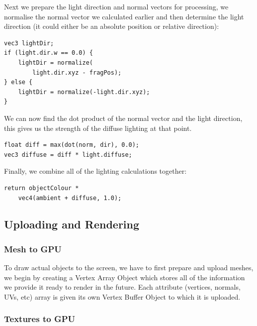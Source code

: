 \documentclass{article}
\begin{document}
\begin{multicols}{2}
                    Next we prepare the light direction and normal vectors for processing, we normalise the normal vector we calculated earlier and then determine the light direction (it could either be an absolute position or relative direction):

                    \begin{lstlisting}
vec3 lightDir;
if (light.dir.w == 0.0) {
    lightDir = normalize(
        light.dir.xyz - fragPos);
} else {
    lightDir = normalize(-light.dir.xyz);
}\end{lstlisting}

                    We can now find the dot product of the normal vector and the light direction, this gives us the strength of the diffuse lighting at that point.

                    \begin{lstlisting}
float diff = max(dot(norm, dir), 0.0);
vec3 diffuse = diff * light.diffuse;\end{lstlisting}

                    Finally, we combine all of the lighting calculations together:

                    \begin{lstlisting}
return objectColour *
    vec4(ambient + diffuse, 1.0);\end{lstlisting}

            \subsection{Uploading and Rendering}
            
                \subsubsection{Mesh to GPU}
            
                    To draw actual objects to the screen, we have to first prepare and upload meshes, we begin by creating a Vertex Array Object \cite{vao} which stores all of the information we provide it ready to render in the future. Each attribute (vertices, normals, UVs, etc) array is given its own Vertex Buffer Object \cite{vbo} to which it is uploaded.
                
                \subsubsection{Textures to GPU}
                

\end{multicols}
\end{document}
